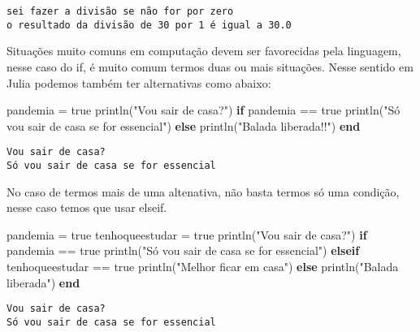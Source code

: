 \documentclass[
  letterpaper,
  DIV=11,
  numbers=noendperiod]{scrreprt}
\newenvironment{Shaded}{\begin{snugshade}}{\end{snugshade}}
\newcommand{\ConstantTok}[1]{\textcolor[rgb]{0.56,0.35,0.01}{#1}}
\newcommand{\ControlFlowTok}[1]{\textcolor[rgb]{0.00,0.23,0.31}{\textbf{#1}}}
\newcommand{\FunctionTok}[1]{\textcolor[rgb]{0.28,0.35,0.67}{#1}}
\newcommand{\NormalTok}[1]{\textcolor[rgb]{0.00,0.23,0.31}{#1}}
\newcommand{\OperatorTok}[1]{\textcolor[rgb]{0.37,0.37,0.37}{#1}}
\newcommand{\StringTok}[1]{\textcolor[rgb]{0.13,0.47,0.30}{#1}}
\begin{document}
\begin{verbatim}
sei fazer a divisão se não for por zero
o resultado da divisão de 30 por 1 é igual a 30.0
\end{verbatim}

Situações muito comuns em computação devem ser favorecidas pela
linguagem, nesse caso do if, é muito comum termos duas ou mais
situações. Nesse sentido em Julia podemos também ter alternativas como
abaixo:

\begin{Shaded}
\begin{Highlighting}[]
\NormalTok{ pandemia }\OperatorTok{=} \ConstantTok{true}
 \FunctionTok{println}\NormalTok{(}\StringTok{"Vou sair de casa?"}\NormalTok{)}
 \ControlFlowTok{if}\NormalTok{ pandemia }\OperatorTok{==} \ConstantTok{true}
    \FunctionTok{println}\NormalTok{(}\StringTok{"Só vou sair de casa se for essencial"}\NormalTok{)}
 \ControlFlowTok{else}
    \FunctionTok{println}\NormalTok{(}\StringTok{"Balada liberada!!"}\NormalTok{)}
 \ControlFlowTok{end}
\end{Highlighting}
\end{Shaded}

\begin{verbatim}
Vou sair de casa?
Só vou sair de casa se for essencial
\end{verbatim}

No caso de termos mais de uma altenativa, não basta termos só uma
condição, nesse caso temos que usar elseif.

\begin{Shaded}
\begin{Highlighting}[]
\NormalTok{pandemia }\OperatorTok{=} \ConstantTok{true}
\NormalTok{tenhoqueestudar }\OperatorTok{=} \ConstantTok{true}
\FunctionTok{println}\NormalTok{(}\StringTok{"Vou sair de casa?"}\NormalTok{)}
\ControlFlowTok{if}\NormalTok{ pandemia }\OperatorTok{==} \ConstantTok{true}
  \FunctionTok{println}\NormalTok{(}\StringTok{"Só vou sair de casa se for essencial"}\NormalTok{)}
\ControlFlowTok{elseif}\NormalTok{ tenhoqueestudar }\OperatorTok{==} \ConstantTok{true}
  \FunctionTok{println}\NormalTok{(}\StringTok{"Melhor ficar em casa"}\NormalTok{)}
\ControlFlowTok{else}
  \FunctionTok{println}\NormalTok{(}\StringTok{"Balada liberada"}\NormalTok{)}
\ControlFlowTok{end}
\end{Highlighting}
\end{Shaded}

\begin{verbatim}
Vou sair de casa?
Só vou sair de casa se for essencial
\end{verbatim}
\end{document}

